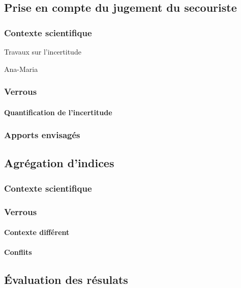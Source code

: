\subsection{Prise en compte du jugement du secouriste}
\label{subsec:2-1-3}

\subsubsection{Contexte scientifique}

Travaux sur l'incertitude

Ana-Maria

\subsubsection{Verrous}

\paragraph{Quantification de l'incertitude}


\subsubsection{Apports envisagés}

\subsection{Agrégation d'indices}
\label{subsec:2-1-4}

\subsubsection{Contexte scientifique}

\subsubsection{Verrous}

\paragraph{Contexte différent}

\paragraph{Conflits}

\subsection{Évaluation des résulats}
\label{subsec:2-1-5}

